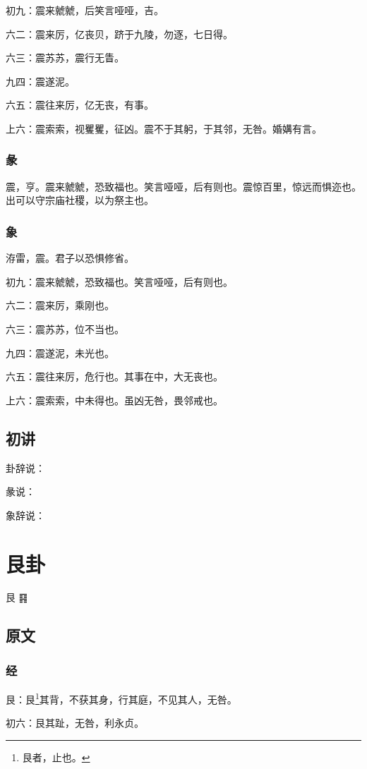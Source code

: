 \documentclass[12pt,oneside]{book}
\begin{document}
初九：震来虩虩，后笑言哑哑，吉。

六二：震来厉，亿丧贝，跻于九陵，勿逐，七日得。

六三：震苏苏，震行无眚。

九四：震遂泥。

六五：震往来厉，亿无丧，有事。

上六：震索索，视矍矍，征凶。震不于其躬，于其邻，无咎。婚媾有言。

\subsection{彖}
震，亨。震来虩虩，恐致福也。笑言哑哑，后有则也。震惊百里，惊远而惧迩也。 出可以守宗庙社稷，以为祭主也。

\subsection{象}
洊雷，震。君子以恐惧修省。

初九：震来虩虩，恐致福也。笑言哑哑，后有则也。

六二：震来厉，乘刚也。

六三：震苏苏，位不当也。

九四：震遂泥，未光也。

六五：震往来厉，危行也。其事在中，大无丧也。

上六：震索索，中未得也。虽凶无咎，畏邻戒也。


\section{初讲}
卦辞说：

彖说：

象辞说：



\chapter{艮卦}
艮 {\Large ䷳}


\section{原文}

\subsection{经}
艮：艮\footnote{艮者，止也。}其背，不获其身，行其庭，不见其人，无咎。

初六：艮其趾，无咎，利永贞。
\end{document}
